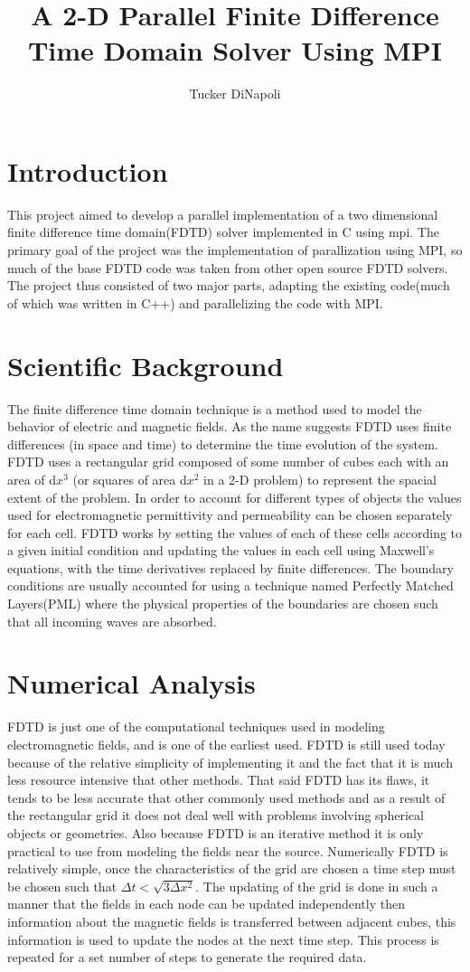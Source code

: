 \documentclass{article}
\author{Tucker DiNapoli}
\title{A 2-D Parallel Finite Difference Time Domain Solver Using MPI}
\begin{document}
\maketitle
\section{Introduction}
This project aimed to develop a parallel implementation of a two dimensional
finite difference time domain(FDTD) solver implemented in C using mpi. The
primary goal of the project was the implementation of parallization using MPI,
so much of the base FDTD code was taken from other open source FDTD solvers.
The project thus consisted of two major parts, adapting the existing code(much
of which was written in C++) and parallelizing the code with MPI.
\section{Scientific Background}
The finite difference time domain technique is a method used to model the
behavior of electric and magnetic fields. As the name suggests FDTD uses finite
differences (in space and time) to determine the time evolution of the
system. FDTD uses a rectangular grid composed of some number of cubes each with
an area of d\(x^3\) (or squares of area d\(x^2\) in a 2-D problem) to represent
the spacial extent of the problem. In order to account for different types of
objects the values used for electromagnetic permittivity and permeability can
be chosen separately for each cell. FDTD works by setting the values of each of
these cells according to a given initial condition and updating the values in
each cell using Maxwell's equations, with the time derivatives replaced by
finite differences. The boundary conditions are usually accounted for using a
technique named Perfectly Matched Layers(PML) where the physical properties of
the boundaries are chosen such that all incoming waves are absorbed.
\section{Numerical Analysis}
FDTD is just one of the computational techniques used in modeling
electromagnetic fields, and is one of the earliest used. FDTD is still used
today because of the relative simplicity of implementing it and the fact that
it is much less resource intensive that other methods. That said FDTD has its
flaws, it tends to be less accurate that other commonly used methods and as a
result of the rectangular grid it does not deal well with problems involving
spherical objects or geometries. Also because FDTD is an iterative method it is
only practical to use from modeling the fields near the source.  Numerically
FDTD is relatively simple, once the characteristics of the grid are chosen a
time step must be chosen such that \(\Delta t < \sqrt{3\Delta x^2}\). The
updating of the grid is done in such a manner that the fields in each node can
be updated independently then information about the magnetic fields is
transferred between adjacent cubes, this information is used to update the
nodes at the next time step. This process is repeated for a set number of steps
to generate the required data.
\end{document}
